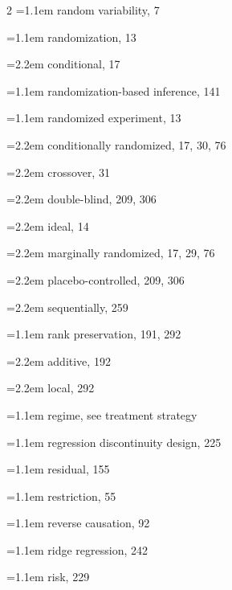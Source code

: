 \begin{multicols}{2}
\hangindent=1.1em random variability, 7\par
\hangindent=1.1em randomization, 13\par
\hspace*{1.1em}\hangindent=2.2em conditional, 17\par
\hangindent=1.1em randomization-based inference, 141\par
\hangindent=1.1em randomized experiment, 13\par
\hspace*{1.1em}\hangindent=2.2em conditionally randomized, 17, 30, 76\par
\hspace*{1.1em}\hangindent=2.2em crossover, 31\par
\hspace*{1.1em}\hangindent=2.2em double-blind, 209, 306\par
\hspace*{1.1em}\hangindent=2.2em ideal, 14\par
\hspace*{1.1em}\hangindent=2.2em marginally randomized, 17, 29, 76\par
\hspace*{1.1em}\hangindent=2.2em placebo-controlled, 209, 306\par
\hspace*{1.1em}\hangindent=2.2em sequentially, 259\par
\hangindent=1.1em rank preservation, 191, 292\par
\hspace*{1.1em}\hangindent=2.2em additive, 192\par
\hspace*{1.1em}\hangindent=2.2em local, 292\par
\hangindent=1.1em regime, see treatment strategy\par
\hangindent=1.1em regression discontinuity design, 225\par
\hangindent=1.1em residual, 155\par
\hangindent=1.1em restriction, 55\par
\hangindent=1.1em reverse causation, 92\par
\hangindent=1.1em ridge regression, 242\par
\hangindent=1.1em risk, 229\par

\end{multicols}

